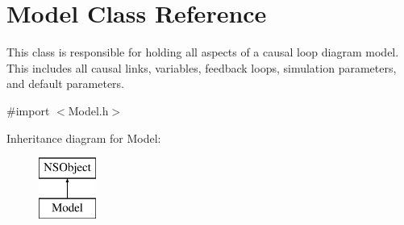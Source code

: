 \hypertarget{interface_model}{\section{Model Class Reference}
\label{interface_model}
}


This class is responsible for holding all aspects of a causal loop diagram model. This includes all causal links, variables, feedback loops, simulation parameters, and default parameters.  




{\ttfamily \#import $<$Model.\-h$>$}

Inheritance diagram for Model\-:\begin{figure}[H]
\begin{center}
\leavevmode
\includegraphics[height=2.000000cm]{interface_model}
\end{center}
\end{figure}
